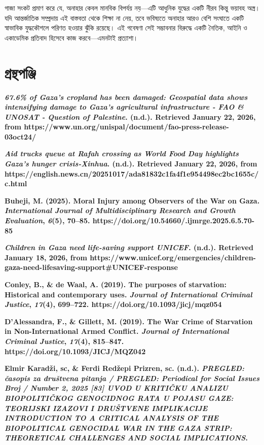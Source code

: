 গাজা সংকট প্রমাণ করে যে, অনাহার কেবল মানবিক বিপর্যয় নয়---এটি আধুনিক যুদ্ধের
একটি নীরব কিন্তু ভয়াবহ অস্ত্র। যদি আন্তর্জাতিক সম্প্রদায় এই বাস্তবতা থেকে শিক্ষা
না নেয়, তবে ভবিষ্যতে অনাহার আরও বেশি সংঘাতে একটি স্বাভাবিক যুদ্ধকৌশলে পরিণত
হওয়ার ঝুঁকি রয়েছে। এই গবেষণা সেই সম্ভাবনার বিরুদ্ধে একটি নৈতিক, আইনি ও
একাডেমিক প্রতিবাদ হিসেবে কাজ করবে---এমনটাই প্রত্যাশা।

\textbf{\hfill\break
}

\section{গ্রন্থপঞ্জি}\label{ux997ux9b0ux9a8ux9a5ux9aaux99eux99c}

\textbf{\emph{67.6\% of Gaza's cropland has been damaged: Geospatial
data shows intensifying damage to Gaza's agricultural infrastructure -
FAO \& UNOSAT - Question of Palestine}. (n.d.). Retrieved January 22,
2026, from
https://www.un.org/unispal/document/fao-press-release-03oct24/}

\textbf{\emph{Aid trucks queue at Rafah crossing as World Food Day
highlights Gaza's hunger crisis-Xinhua}. (n.d.). Retrieved January 22,
2026, from
https://english.news.cn/20251017/ada81832c1fa4f1e954498ec2bc1655c/c.html}

\textbf{Buheji, M. (2025). Moral Injury among Observers of the War on
Gaza. \emph{International Journal of Multidisciplinary Research and
Growth Evaluation}, \emph{6}(5), 70--85.
https://doi.org/10.54660/.ijmrge.2025.6.5.70-85}

\textbf{\emph{Children in Gaza need life-saving support \textbar{}
UNICEF}. (n.d.). Retrieved January 18, 2026, from
https://www.unicef.org/emergencies/children-gaza-need-lifesaving-support\#UNICEF-response}

\textbf{Conley, B., \& de Waal, A. (2019). The purposes of starvation:
Historical and contemporary uses. \emph{Journal of International
Criminal Justice}, \emph{17}(4), 699--722.
https://doi.org/10.1093/jicj/mqz054}

\textbf{D'Alessandra, F., \& Gillett, M. (2019). The War Crime of
Starvation in Non-International Armed Conflict. \emph{Journal of
International Criminal Justice}, \emph{17}(4), 815--847.
https://doi.org/10.1093/JICJ/MQZ042}

\textbf{Elmir Karadži, sc, \& Ferdi Redžepi Prizren, sc. (n.d.).
\emph{PREGLED: časopis za društvena pitanja / PREGLED: Periodical for
Social Issues Broj / Number 2, 2025 {[}83{]} UVOD U KRITIČKU ANALIZU
BIOPOLITIČKOG GENOCIDNOG RATA U POJASU GAZE: TEORIJSKI IZAZOVI I
DRUŠTVENE IMPLIKACIJE INTRODUCTION TO A CRITICAL ANALYSIS OF THE
BIOPOLITICAL GENOCIDAL WAR IN THE GAZA STRIP: THEORETICAL CHALLENGES AND
SOCIAL IMPLICATIONS}.}

